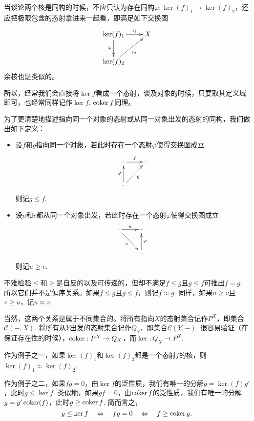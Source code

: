 当谈论两个核是同构的时候，不应只认为存在同构$\varphi:\ker(f)_1\to \ker(f)_2$，还应把极限包含的态射拿进来一起看，即满足如下交换图
\[
\begin{xy}
	\xymatrix{
	\ker(f)_1\ar[d]_{\varphi}\ar[r]^-{i_1} &X\\
	\ker(f)_2\ar[ru]_{i_2}
	}
\end{xy}
\]
余核也是类似的。

所以，经常我们会直接将$\ker f$看成一个态射，谈及对象的时候，只要取其定义域即可，也经常同样记作$\ker f$. $\operatorname{coker} f$同理。

\begin{para}

为了更清楚地描述指向同一个对象的态射或从同一对象出发的态射的同构，我们做出如下定义：

\begin{itemize}
\item 设$f$和$g$指向同一个对象，若此时存在一个态射$\varphi$使得交换图成立
\[
\begin{xy}
	\xymatrix{
	\cdot\ar[r]^-{f} &\cdot\\
	\cdot \ar[u]^{\varphi}\ar[ru]_{g}
	}
\end{xy}
\]
则记$g\leq f$. 

\item  设$u$和$v$都从同一个对象出发，若此时存在一个态射$\varphi$使得交换图成立
\[
\begin{xy}
	\xymatrix{
	\cdot \ar[r]^-{u}\ar[rd]_{v} &\cdot \\
	&\cdot \ar[u]_{\varphi}
	}
\end{xy}
\]
则记$u\geq v$. 
\end{itemize}

不难检验$\leq$和$\geq$是自反的以及可传递的，但却不满足$f\leq g$且$g\leq f$可推出$f=g$. 所以它们并不是偏序关系。如果$f\leq g$且$g\leq f$，则记$f\approx g$. 同样，如果$u\geq v$且$v\geq u$，记$u\approx v$.

当然，这两个关系是属于不同集合的。将所有指向$X$的态射集合记作$P^X$，即集合$\mathcal{C}(-,X)$. 将所有从$Y$出发的态射集合记作$Q_Y$，即集合$\mathcal{C}(Y,-)$. 很容易验证（在保证存在性的时候），$\operatorname{coker} : P^X \to Q_X$，而$\ker : Q_X\to P^X$.
\end{para}

作为例子之一，如果$\ker(f)_1$和$\ker(f)_2$都是一个态射$f$的核，则$\ker(f)_1\approx\ker(f)_2$. 

作为例子之二，如果$fg=0$，由$\ker f$的泛性质，我们有唯一的分解$g=\ker(f)g'$，此时$g\leq \ker f$. 类似地，如果$gf=0$，由$\operatorname{coker} f$的泛性质，我们有唯一的分解$g=g'\operatorname{coker}(f)$，此时$g\geq \operatorname{coker} f$. 简而言之，
\[
	g\leq \ker f \quad \Leftrightarrow \quad fg=0\quad  \Leftrightarrow \quad f\geq \operatorname{coker} g.
\]

